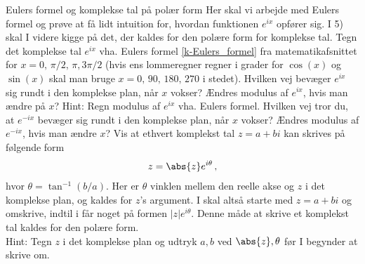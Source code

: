 \begin{opgave}[3]{Eulers formel og komplekse tal på polær form}
Her skal vi arbejde med Eulers formel og prøve at få lidt intuition for, hvordan funktionen $e^{ix}$ opfører sig. I 5) skal I videre kigge på det, der kaldes for den polære form for komplekse tal.
\opg Tegn det komplekse tal $e^{ix}$ vha. Eulers formel \eqref{k-Eulers_formel} fra matematikafsnittet for $x=0, \, \pi/2, \, \pi, 3\pi/2$ (hvis ens lommeregner regner i grader for $\cos(x)$ og $\sin(x)$ skal man bruge $x=0, \, 90, \, 180, \, 270$ i stedet). Hvilken vej bevæger $e^{ix}$ sig rundt i den komplekse plan, når $x$ vokser?
\opg Ændres modulus af $e^{ix}$, hvis man ændre på $x$? Hint: Regn modulus af $e^{ix}$ vha. Eulers formel.
\opg Hvilken vej tror du, at $e^{-ix}$ bevæger sig rundt i den komplekse plan, når $x$ vokser?
\opg Ændres modulus af $e^{-ix}$, hvis man ændre $x$?
\opg Vis at ethvert komplekst tal $z = a+bi$ kan skrives på følgende form
\begin{align}
z = \abs{z}e^{i\theta} \, ,
\end{align} 
hvor $\theta = \tan^{-1}(b/a)$. Her er $\theta$ vinklen mellem den reelle akse og $z$ i det komplekse plan, og kaldes for $z$'s argument. I skal altså starte med $z=a+bi$ og omskrive, indtil i får noget på formen $|z|e^{i\theta}$. Denne måde at skrive et komplekst tal kaldes for den polære form.\\
Hint: Tegn $z$ i det komplekse plan og udtryk $a,b$ ved $\abs{z},\theta$ før I begynder at skrive om.
\end{opgave}
